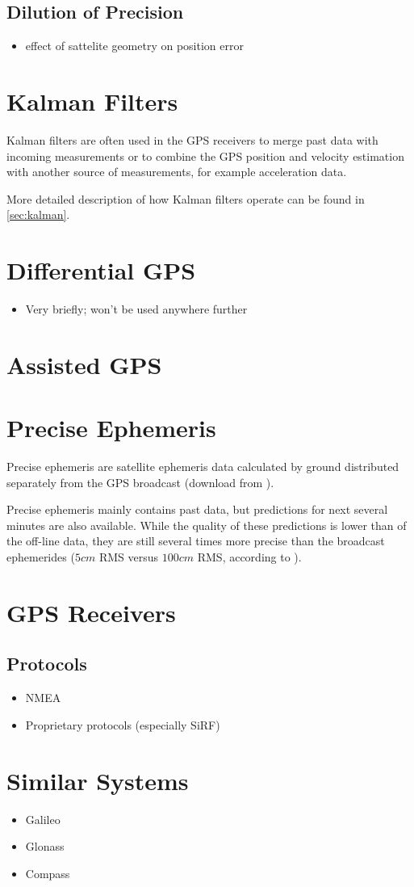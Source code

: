 \subsection{Dilution of Precision}
\begin{itemize}
\item effect of sattelite geometry on position error
\end{itemize}

\section{Kalman Filters}
Kalman filters are often used in the GPS receivers to merge past
data with incoming measurements or to combine the GPS position and velocity
estimation with another source of measurements, for example acceleration data.

More detailed description of how Kalman filters operate can be found in
\ref{sec:kalman}.

\section{Differential GPS}
\begin{itemize}
\item Very briefly; won't be used anywhere further
\end{itemize}

\section{Assisted GPS}

\section{Precise Ephemeris}
Precise ephemeris are satellite ephemeris data calculated by ground distributed separately
from the GPS broadcast (download from \cite{orbit-data}).

Precise ephemeris mainly contains past data, but predictions for next several
minutes are also available.
While the quality of these predictions is lower than of the off-line data,
they are still several times more precise than the broadcast ephemerides
(\(5 cm\) RMS versus \(100 cm\) RMS, according to \cite{orbit-data}).




\section{GPS Receivers}
\subsection{Protocols}
\begin{itemize}
\item NMEA
\item Proprietary protocols (especially SiRF)
\end{itemize}

\section{Similar Systems}
\begin{itemize}
\item Galileo
\item Glonass
\item Compass
\end{itemize}
